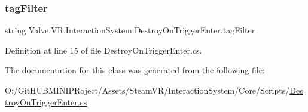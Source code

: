 \subsubsection{\texorpdfstring{tagFilter}{tagFilter}}
{\footnotesize\ttfamily string Valve.\+V\+R.\+Interaction\+System.\+Destroy\+On\+Trigger\+Enter.\+tag\+Filter}



Definition at line 15 of file Destroy\+On\+Trigger\+Enter.\+cs.



The documentation for this class was generated from the following file\+:\begin{DoxyCompactItemize}
\item 
O\+:/\+Git\+H\+U\+B\+M\+I\+N\+I\+P\+Roject/\+Assets/\+Steam\+V\+R/\+Interaction\+System/\+Core/\+Scripts/\mbox{\hyperlink{_destroy_on_trigger_enter_8cs}{Destroy\+On\+Trigger\+Enter.\+cs}}\end{DoxyCompactItemize}
